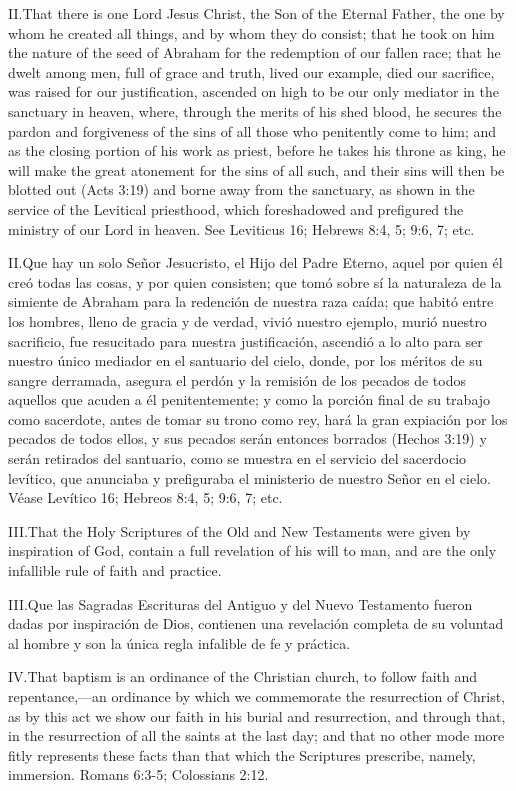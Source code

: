 \lettrine{II.} That there is one Lord Jesus Christ, the Son of the Eternal Father, the one by whom he created all things, and by whom they do consist; that he took on him the nature of the seed of Abraham for the redemption of our fallen race; that he dwelt among men, full of grace and truth, lived our example, died our sacrifice, was raised for our justification, ascended on high to be our only mediator in the sanctuary in heaven, where, through the merits of his shed blood, he secures the pardon and forgiveness of the sins of all those who penitently come to him; and as the closing portion of his work as priest, before he takes his throne as king, he will make the great atonement for the sins of all such, and their sins will then be blotted out (Acts 3:19) and borne away from the sanctuary, as shown in the service of the Levitical priesthood, which foreshadowed and prefigured the ministry of our Lord in heaven. See Leviticus 16; Hebrews 8:4, 5; 9:6, 7; etc.


\lettrine{II.} Que hay un solo Señor Jesucristo, el Hijo del Padre Eterno, aquel por quien él creó todas las cosas, y por quien consisten; que tomó sobre sí la naturaleza de la simiente de Abraham para la redención de nuestra raza caída; que habitó entre los hombres, lleno de gracia y de verdad, vivió nuestro ejemplo, murió nuestro sacrificio, fue resucitado para nuestra justificación, ascendió a lo alto para ser nuestro único mediador en el santuario del cielo, donde, por los méritos de su sangre derramada, asegura el perdón y la remisión de los pecados de todos aquellos que acuden a él penitentemente; y como la porción final de su trabajo como sacerdote, antes de tomar su trono como rey, hará la gran expiación por los pecados de todos ellos, y sus pecados serán entonces borrados (Hechos 3:19) y serán retirados del santuario, como se muestra en el servicio del sacerdocio levítico, que anunciaba y prefiguraba el ministerio de nuestro Señor en el cielo. Véase Levítico 16; Hebreos 8:4, 5; 9:6, 7; etc.


\lettrine{III.} That the Holy Scriptures of the Old and New Testaments were given by inspiration of God, contain a full revelation of his will to man, and are the only infallible rule of faith and practice.


\lettrine{III.} Que las Sagradas Escrituras del Antiguo y del Nuevo Testamento fueron dadas por inspiración de Dios, contienen una revelación completa de su voluntad al hombre y son la única regla infalible de fe y práctica.


\lettrine{IV.} That baptism is an ordinance of the Christian church, to follow faith and repentance,—an ordinance by which we commemorate the resurrection of Christ, as by this act we show our faith in his burial and resurrection, and through that, in the resurrection of all the saints at the last day; and that no other mode more fitly represents these facts than that which the Scriptures prescribe, namely, immersion. Romans 6:3-5; Colossians 2:12.



